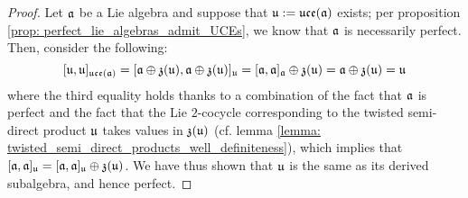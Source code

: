             \begin{proof}
                Let $\mathfrak{a}$ be a Lie algebra and suppose that $\mathfrak{u} := \mathfrak{uce}(\mathfrak{a})$ exists; per proposition \ref{prop: perfect_lie_algebras_admit_UCEs}, we know that $\mathfrak{a}$ is necessarily perfect. Then, consider the following:
                    $$[\mathfrak{u}, \mathfrak{u}]_{\mathfrak{uce}(\mathfrak{a})} = [\mathfrak{a} \oplus \mathfrak{z}(\mathfrak{u}), \mathfrak{a} \oplus \mathfrak{z}(\mathfrak{u})]_{\mathfrak{u}} = [\mathfrak{a}, \mathfrak{a}]_{\mathfrak{a}} \oplus \mathfrak{z}(\mathfrak{u}) = \mathfrak{a} \oplus \mathfrak{z}(\mathfrak{u}) = \mathfrak{u}$$
                where the third equality holds thanks to a combination of the fact that $\mathfrak{a}$ is perfect and the fact that the Lie $2$-cocycle corresponding to the twisted semi-direct product $\mathfrak{u}$ takes values in $\mathfrak{z}(\mathfrak{u})$ (cf. lemma \ref{lemma: twisted_semi_direct_products_well_definiteness}), which implies that $[\mathfrak{a}, \mathfrak{a}]_{\mathfrak{u}} = [\mathfrak{a}, \mathfrak{a}]_{\mathfrak{u}} \oplus \mathfrak{z}(\mathfrak{u})$. We have thus shown that $\mathfrak{u}$ is the same as its derived subalgebra, and hence perfect.
            \end{proof}

